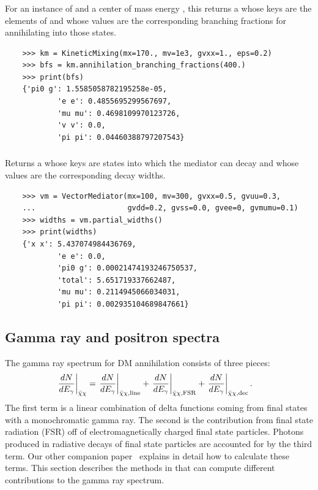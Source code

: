 \subsubsection{}

For an instance  of  and a center of mass energy , this returns a  whose keys are the elements of  and whose values are the corresponding branching fractions for annihilating into those states.
\begin{verbatim}
    >>> km = KineticMixing(mx=170., mv=1e3, gvxx=1., eps=0.2)
    >>> bfs = km.annihilation_branching_fractions(400.)
    >>> print(bfs)
    {'pi0 g': 1.5585058782195258e-05,
            'e e': 0.4855695299567697,
            'mu mu': 0.4698109970123726,
            'v v': 0.0,
            'pi pi': 0.04460388797207543}
\end{verbatim}

\subsubsection{}

Returns a  whose keys are states into which the mediator can decay and whose values are the corresponding decay widths.
\begin{verbatim}
    >>> vm = VectorMediator(mx=100, mv=300, gvxx=0.5, gvuu=0.3,
    ...                     gvdd=0.2, gvss=0.0, gvee=0, gvmumu=0.1)
    >>> widths = vm.partial_widths()
    >>> print(widths)
    {'x x': 5.437074984436769,
            'e e': 0.0,
            'pi0 g': 0.00021474193246750537,
            'total': 5.651719337662487,
            'mu mu': 0.2114945066034031,
            'pi pi': 0.002935104689847661}
\end{verbatim}

\subsection{Gamma ray and positron spectra}

The gamma ray spectrum for DM annihilation consists of three pieces:
\begin{align}
    \left. \frac{dN}{dE_\gamma} \right|_{\bar{\chi}\chi} & = \left. \frac{dN}{dE_\gamma} \right|_{\bar{\chi}\chi,{\mathrm{line}}} + \left. \frac{dN}{dE_\gamma} \right|_{\bar{\chi}\chi,{\mathrm{FSR}}} + \left. \frac{dN}{dE_\gamma} \right|_{\bar{\chi}\chi,{\mathrm{dec}}}.
\end{align}
The first term is a linear combination of delta functions coming from final states with a monochromatic gamma ray. The second is the contribution from final state radiation (FSR) off of electromagnetically charged final state particles. Photons produced in radiative decays of final state particles are accounted for by the third term. Our other companion paper~\cite{spectrum_paper} explains in detail how to calculate these terms. This section describes the methods in  that can compute different contributions to the gamma ray spectrum.

